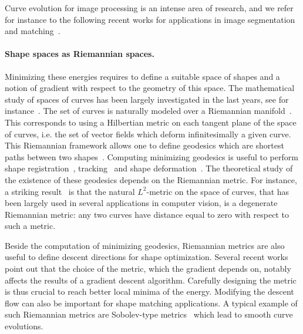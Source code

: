 Curve evolution for image processing is an intense area of research, and we refer for instance to the following recent works for applications in image segmentation~\cite{a,b,c,d} and matching~\cite{SotirasDP13,e,f}.

\paragraph{Shape spaces as Riemannian spaces.}

Minimizing these energies requires to define a suitable space of shapes and a notion of gradient with respect to the geometry of this space. The  mathematical study of spaces of curves has been largely investigated in the last years, see for instance~\cite{Younes-elastic-distance,Mennucci-CIME}. 
The set of curves is naturally modeled over a Riemannian manifold~\cite{MaMi}. This corresponds to using a Hilbertian metric on each tangent plane of the space of curves, i.e. the set of vector fields which deform infinitesimally a given curve. This Riemannian framework allows one to define geodesics which are shortest paths between two shapes~\cite{Younes-explicit-geodesic,Mennucci-Stiefel-manifolds}. Computing minimizing geodesics is useful to perform shape registration~\cite{Mennucci-filtering,Younes-04,2010.03.20}, tracking~\cite{Mennucci-filtering} and shape deformation~\cite{Kilian-shape-space}. The theoretical study of the existence of these geodesics depends on the Riemannian metric. For instance, a striking result~\cite{MaMi,Yezzi-Menn-2005b,Yezzi-Menn-2005a} is that the natural $L^2$-metric on the space of curves, that has been largely used in several applications in computer vision, is a degenerate Riemannian metric: any two  curves have distance equal to zero with respect to such a metric.

Beside the computation of minimizing geodesics, Riemannian metrics are also useful to define descent directions for shape optimization. Several recent works~\cite{MaMi,charpiat-new-metrics,Yezzi-Menn-2005a,Yezzi-Menn-2005b} point out that  the choice of the metric, which the gradient depends on,  notably affects the results of a gradient descent algorithm. Carefully designing the metric is thus crucial to reach better local minima of the energy. Modifying the descent flow can also be important for shape matching applications. A typical example of such  Riemannian metrics are Sobolev-type metrics~\cite{sundaramoorthi-sobolev-active,sundaramoorthi-2006,sundaramoorthi-new-possibilities, Yezzi-H2} which lead to smooth curve evolutions. 


